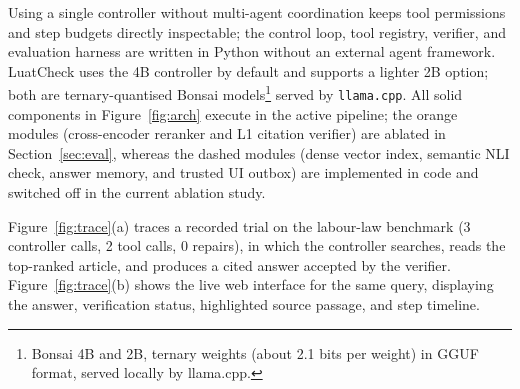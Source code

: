Using a single controller without multi-agent coordination keeps tool permissions and step budgets directly inspectable; the control loop, tool registry, verifier, and evaluation harness are written in Python without an external agent framework. LuatCheck uses the 4B controller by default and supports a lighter 2B option; both are ternary-quantised Bonsai models\footnote{Bonsai 4B and 2B, ternary weights (about 2.1 bits per weight) in GGUF format, served locally by llama.cpp.} served by \texttt{llama.cpp}. All solid components in Figure~\ref{fig:arch} execute in the active pipeline; the orange modules (cross-encoder reranker and L1 citation verifier) are ablated in Section~\ref{sec:eval}, whereas the dashed modules (dense vector index, semantic NLI check, answer memory, and trusted UI outbox) are implemented in code and switched off in the current ablation study.


 Figure~\ref{fig:trace}(a) traces a recorded trial on the labour-law benchmark (3 controller calls, 2 tool calls, 0 repairs), in which the controller searches, reads the top-ranked article, and produces a cited answer accepted by the verifier. Figure~\ref{fig:trace}(b) shows the live web interface for the same query, displaying the answer, verification status, highlighted source passage, and step timeline.

